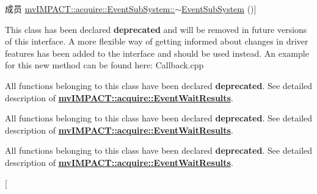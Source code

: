 \begin{DoxyRefList}
成员 \hyperlink{classmv_i_m_p_a_c_t_1_1acquire_1_1_event_sub_system_a69d2a064b0b7c16861e7512491af81e7}{mv\+I\+M\+P\+A\+C\+T\+:\+:acquire\+:\+:Event\+Sub\+System\+:\+:$\sim$\+Event\+Sub\+System} ()]
\item[\label{deprecated__deprecated000012}%
\hypertarget{deprecated__deprecated000012}{}%
类 \hyperlink{classmv_i_m_p_a_c_t_1_1acquire_1_1_event_wait_results}{mv\+I\+M\+P\+A\+C\+T\+:\+:acquire\+:\+:Event\+Wait\+Results} ]This class has been declared {\bfseries deprecated} and will be removed in future versions of this interface. A more flexible way of getting informed about changes in driver features has been added to the interface and should be used instead. An example for this new method can be found here\+: Callback.\+cpp 
\item[\label{deprecated__deprecated000025}%
\hypertarget{deprecated__deprecated000025}{}%
成员 \hyperlink{classmv_i_m_p_a_c_t_1_1acquire_1_1_event_wait_results_a72954fbe6c75cc1ca7c6123c02358350}{mv\+I\+M\+P\+A\+C\+T\+:\+:acquire\+:\+:Event\+Wait\+Results\+:\+:error\+Code} (void) const ]All functions belonging to this class have been declared {\bfseries deprecated}. See detailed description of {\bfseries \hyperlink{classmv_i_m_p_a_c_t_1_1acquire_1_1_event_wait_results}{mv\+I\+M\+P\+A\+C\+T\+::acquire\+::\+Event\+Wait\+Results}}.  
\item[\label{deprecated__deprecated000024}%
\hypertarget{deprecated__deprecated000024}{}%
成员 \hyperlink{group___device_specific_interface_ga6f53d7cf6f361a7a87d468be369c6a1e}{mv\+I\+M\+P\+A\+C\+T\+:\+:acquire\+:\+:Event\+Wait\+Results\+:\+:Event\+Wait\+Results} (int error\+Code, T\+Device\+Event\+Type wait\+Mask, T\+Device\+Event\+Type result\+Mask)]All functions belonging to this class have been declared {\bfseries deprecated}. See detailed description of {\bfseries \hyperlink{classmv_i_m_p_a_c_t_1_1acquire_1_1_event_wait_results}{mv\+I\+M\+P\+A\+C\+T\+::acquire\+::\+Event\+Wait\+Results}}.  
\item[\label{deprecated__deprecated000027}%
\hypertarget{deprecated__deprecated000027}{}%
成员 \hyperlink{classmv_i_m_p_a_c_t_1_1acquire_1_1_event_wait_results_a26d8df5e9f77bcfed2dd550c993e5306}{mv\+I\+M\+P\+A\+C\+T\+:\+:acquire\+:\+:Event\+Wait\+Results\+:\+:result\+Mask} (void) const ]All functions belonging to this class have been declared {\bfseries deprecated}. See detailed description of {\bfseries \hyperlink{classmv_i_m_p_a_c_t_1_1acquire_1_1_event_wait_results}{mv\+I\+M\+P\+A\+C\+T\+::acquire\+::\+Event\+Wait\+Results}}.  
\item[\label{deprecated__deprecated000026}%

\end{DoxyRefList}
